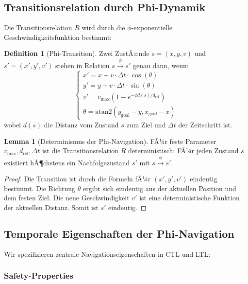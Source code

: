 ﻿\documentclass[a4paper,12pt]{article}
\theoremstyle{definition}
\newtheorem{definition}{Definition}[section]
\newtheorem{lemma}{Lemma}[section]
\begin{document}
\subsection{Transitionsrelation durch Phi-Dynamik}

Die Transitionsrelation $R$ wird durch die $\phi$-exponentielle Geschwindigkeitsfunktion bestimmt:

\begin{definition}[Phi-Transition]
Zwei ZustÃ¤nde $s = (x, y, v)$ und $s' = (x', y', v')$ stehen in Relation $s \xrightarrow{\phi} s'$ genau dann, wenn:
\[
\begin{cases}
x' = x + v \cdot \Delta t \cdot \cos(\theta) \\
y' = y + v \cdot \Delta t \cdot \sin(\theta) \\
v' = v_{\max}(1 - e^{-\phi d(s)/d_{\text{ref}}}) \\
\theta = \text{atan2}(y_{\text{goal}} - y, x_{\text{goal}} - x)
\end{cases}
\]
wobei $d(s)$ die Distanz vom Zustand $s$ zum Ziel und $\Delta t$ der Zeitschritt ist.
\end{definition}

\begin{lemma}[Determinismus der Phi-Navigation]
FÃ¼r feste Parameter $v_{\max}, d_{\text{ref}}, \Delta t$ ist die Transitionsrelation $R$ deterministisch: FÃ¼r jeden Zustand $s$ existiert hÃ¶chstens ein Nachfolgezustand $s'$ mit $s \xrightarrow{\phi} s'$.
\end{lemma}

\begin{proof}
Die Transition ist durch die Formeln fÃ¼r $(x', y', v')$ eindeutig bestimmt. Die Richtung $\theta$ ergibt sich eindeutig aus der aktuellen Position und dem festen Ziel. Die neue Geschwindigkeit $v'$ ist eine deterministische Funktion der aktuellen Distanz. Somit ist $s'$ eindeutig.
\end{proof}

\subsection{Temporale Eigenschaften der Phi-Navigation}

Wir spezifizieren zentrale Navigationseigenschaften in CTL und LTL:

\subsubsection{Safety-Properties}
\end{document}
